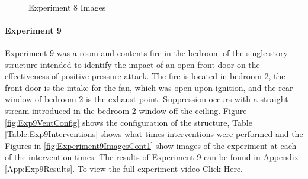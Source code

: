 \documentclass{article}
\begin{document}
\begin{figure}[H]
	\ContinuedFloat 
	\centering 
	 \ 
	\caption{Experiment 8 Images}
	\label{fig:Experiment8ImagesCont3} 
\end{figure}

\paragraph{Experiment 9}\mbox{}

Experiment 9 was a room and contents fire in the bedroom of the single story structure intended to identify the impact of an open front door on the effectiveness of positive pressure attack. The fire is located in bedroom 2, the front door is the intake for the fan, which was open upon ignition, and the rear window of bedroom 2 is the exhaust point. Suppression occurs with a straight stream introduced in the bedroom 2 window off the ceiling. Figure \ref{fig:Exp9VentConfig} shows the configuration of the structure, Table \ref{Table:Exp9Interventions} shows what times interventions were performed and the Figures in \ref{fig:Experiment9ImagesCont1} show images of the experiment at each of the intervention times. The results of Experiment 9 can be found in Appendix \ref{App:Exp9Results}. To view the full experiment video \href{https://youtu.be/_t64OLbhjks}{Click Here}.
\end{document}
